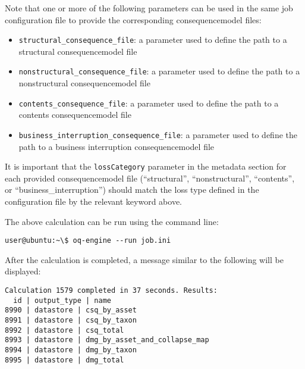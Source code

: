 Note that one or more of the following parameters can be used in the same job
configuration file to provide the corresponding \gls{consequencemodel} files:

\begin{itemize}

  \item \Verb+structural_consequence_file+: a parameter used to define the path
    to a structural \gls{consequencemodel} file

  \item \Verb+nonstructural_consequence_file+: a parameter used to define the path
    to a nonstructural \gls{consequencemodel} file

  \item \Verb+contents_consequence_file+: a parameter used to define the path
    to a contents \gls{consequencemodel} file

  \item \Verb+business_interruption_consequence_file+: a parameter used to define
    the path to a business interruption \gls{consequencemodel} file

\end{itemize}

It is important that the \Verb+lossCategory+ parameter in the metadata section
for each provided \gls{consequencemodel} file (``structural'', ``nonstructural'',
``contents'', or ``business\_interruption'') should match the loss type
defined in the configuration file by the relevant keyword above.

The above calculation can be run using the command line:

\begin{verbatim}
user@ubuntu:~\$ oq-engine --run job.ini
\end{verbatim}

After the calculation is completed, a message similar to the following will be
displayed:

\begin{verbatim}
Calculation 1579 completed in 37 seconds. Results:
  id | output_type | name
8990 | datastore | csq_by_asset
8991 | datastore | csq_by_taxon
8992 | datastore | csq_total
8993 | datastore | dmg_by_asset_and_collapse_map
8994 | datastore | dmg_by_taxon
8995 | datastore | dmg_total
\end{verbatim}
